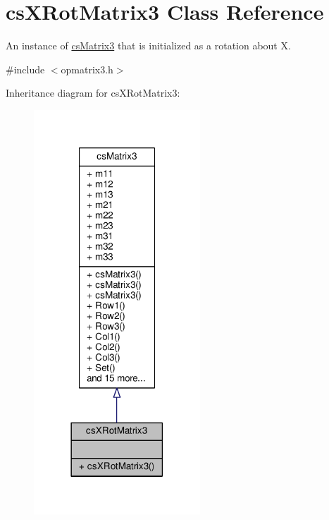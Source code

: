 \hypertarget{classcsXRotMatrix3}{}\section{cs\+X\+Rot\+Matrix3 Class Reference}
\label{classcsXRotMatrix3}


An instance of \hyperlink{classcsMatrix3}{cs\+Matrix3} that is initialized as a rotation about X.  




{\ttfamily \#include $<$opmatrix3.\+h$>$}



Inheritance diagram for cs\+X\+Rot\+Matrix3\+:
\nopagebreak
\begin{figure}[H]
\begin{center}
\leavevmode
\includegraphics[width=177pt]{dc/de3/classcsXRotMatrix3__inherit__graph}
\end{center}
\end{figure}


